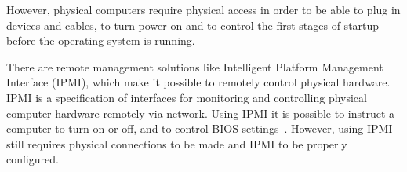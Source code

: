 However, physical computers require physical access in order to be
able to plug in devices and cables, to turn power on and to control
the first stages of startup before the operating system is running.

There are remote management solutions like Intelligent Platform
Management Interface (IPMI), which make it possible to remotely
control physical hardware. IPMI is a specification of interfaces for
monitoring and controlling physical computer hardware remotely via
network. Using IPMI it is possible to instruct a computer to turn on
or off, and to control BIOS settings~\cite{ipmi-spec}. However, using
IPMI still requires physical connections to be made and IPMI to be
properly configured.
